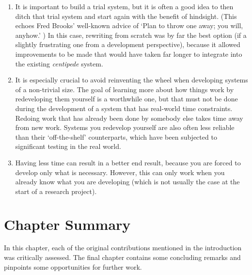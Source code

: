 \begin{enumerate}

\item It is important to build a trial system, but it is often a good idea to then ditch that trial system and start again with the benefit of hindsight. (This echoes Fred Brooks' well-known advice of `Plan to throw one away; you will, anyhow.' \cite{brooks74}) In this case, rewriting from scratch was by far the best option (if a slightly frustrating one from a development perspective), because it allowed improvements to be made that would have taken far longer to integrate into the existing \emph{centipede} system.

\item It is especially crucial to avoid reinventing the wheel when developing systems of a non-trivial size. The goal of learning more about how things work by redeveloping them yourself is a worthwhile one, but that must not be done during the development of a system that has real-world time constraints. Redoing work that has already been done by somebody else takes time away from new work. Systems you redevelop yourself are also often less reliable than their `off-the-shelf' counterparts, which have been subjected to significant testing in the real world.

\item Having less time can result in a better end result, because you are forced to develop only what is necessary. However, this can only work when you already know what you are developing (which is not usually the case at the start of a research project).

\end{enumerate}

\section{Chapter Summary}

In this chapter, each of the original contributions mentioned in the introduction was critically assessed. The final chapter contains some concluding remarks and pinpoints some opportunities for further work.
